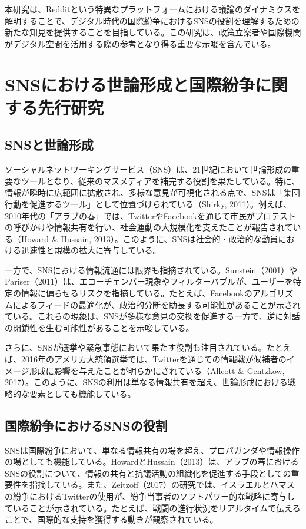 \documentclass[11pt, a4j]{jreport}
\begin{document}
    本研究は、Redditという特異なプラットフォームにおける議論のダイナミクスを解明することで、デジタル時代の国際紛争におけるSNSの役割を理解するための新たな知見を提供することを目指している。この研究は、政策立案者や国際機関がデジタル空間を活用する際の参考となり得る重要な示唆を含んでいる。

    \chapter{SNSにおける世論形成と国際紛争に関する先行研究}

    \section{SNSと世論形成}
    ソーシャルネットワーキングサービス（SNS）は、21世紀において世論形成の重要なツールとなり、従来のマスメディアを補完する役割を果たしている。特に、情報が瞬時に広範囲に拡散され、多様な意見が可視化される点で、SNSは「集団行動を促進するツール」として位置づけられている（Shirky, 2011）。例えば、2010年代の「アラブの春」では、TwitterやFacebookを通じて市民がプロテストの呼びかけや情報共有を行い、社会運動の大規模化を支えたことが報告されている（Howard & Hussain, 2013）。このように、SNSは社会的・政治的な動員における迅速性と規模の拡大に寄与している。

    一方で、SNSにおける情報流通には限界も指摘されている。Sunstein（2001）やPariser（2011）は、エコーチェンバー現象やフィルターバブルが、ユーザーを特定の情報に偏らせるリスクを指摘している。たとえば、Facebookのアルゴリズムによるフィードの最適化が、政治的分断を助長する可能性があることが示されている。これらの現象は、SNSが多様な意見の交換を促進する一方で、逆に対話の閉鎖性を生む可能性があることを示唆している。

    さらに、SNSが選挙や緊急事態において果たす役割も注目されている。たとえば、2016年のアメリカ大統領選挙では、Twitterを通じての情報戦が候補者のイメージ形成に影響を与えたことが明らかにされている（Allcott & Gentzkow, 2017）。このように、SNSの利用は単なる情報共有を超え、世論形成における戦略的な要素としても機能している。

    \section{国際紛争におけるSNSの役割}
    SNSは国際紛争において、単なる情報共有の場を超え、プロパガンダや情報操作の場としても機能している。HowardとHussain（2013）は、アラブの春におけるSNSの役割について、情報の共有と抗議活動の組織化を促進する手段としての重要性を指摘している。また、Zeitzoff（2017）の研究では、イスラエルとハマスの紛争におけるTwitterの使用が、紛争当事者のソフトパワー的な戦略に寄与していることが示されている。たとえば、戦闘の進行状況をリアルタイムで伝えることで、国際的な支持を獲得する動きが観察されている。
\end{document}
